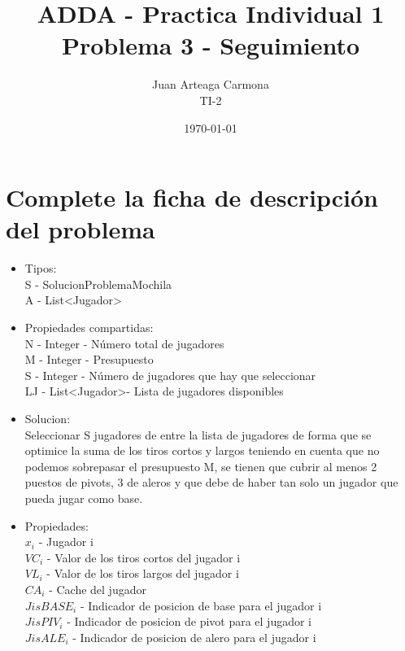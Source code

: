 \documentclass[a4paper,12pt]{article}
\title{ADDA - Practica Individual 1\\ Problema 3 - Seguimiento}
\author{Juan Arteaga Carmona\\TI-2}
\date{\today}
\begin{document}
\maketitle

\section{Complete la ficha de descripción del problema}


\begin{itemize}
 \item Tipos:\\
 S - SolucionProblemaMochila\\
 A - List\textless Jugador\textgreater

 \item Propiedades compartidas:\\
 N - Integer - Número total de jugadores\\
 M - Integer - Presupuesto\\
 S - Integer - Número de jugadores que hay que seleccionar\\
 LJ - List\textless Jugador\textgreater - Lista de jugadores disponibles\\
 \item Solucion:\\
Seleccionar S jugadores de entre la lista de jugadores de forma que se optimice
la suma de los tiros cortos y largos teniendo en cuenta que no podemos sobrepasar el presupuesto M, se tienen que cubrir
 al menos 2 puestos de pivots, 3 de aleros y que debe de haber tan solo un jugador
 que pueda jugar como base.


\item Propiedades:\\
\begin{math}
 x_i
\end{math}
- Jugador i\\
\begin{math}
VC_i
\end{math}
- Valor de los tiros cortos del jugador i\\
\begin{math}
VL_i
\end{math}
- Valor de los tiros largos del jugador i\\
 \begin{math}
CA_i
 \end{math}
 - Cache del jugador\\
 \begin{math}
JisBASE_i
 \end{math}
 - Indicador de posicion de base para el jugador i\\
 \begin{math}
JisPIV_i
 \end{math}
 - Indicador de posicion de pivot para el jugador i\\
 \begin{math}
JisALE_i
 \end{math}
 - Indicador de posicion de alero para el jugador i\\



\end{itemize}
\end{document}
